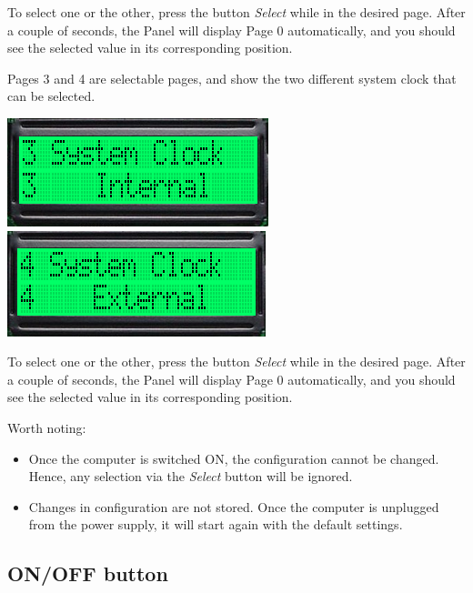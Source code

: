         To select one or the other, press the button \textit{Select} while in
        the desired page. After a couple of seconds, the Panel will display Page
        0 automatically, and you should see the selected value in its
        corresponding position.

        Pages 3 and 4 are selectable pages, and show the two different system
        clock that can be selected.

        \begin{center}
            \includegraphics[scale=0.7]{images/dastaZ80_ControlPanel_Page3.png}
            \includegraphics[scale=0.7]{images/dastaZ80_ControlPanel_Page4.png}
        \end{center}
                
        To select one or the other, press the button \textit{Select} while in
        the desired page. After a couple of seconds, the Panel will display Page
        0 automatically, and you should see the selected value in its
        corresponding position.

        Worth noting:

        \begin{itemize}
            \item Once the computer is switched ON, the configuration cannot be
                changed. Hence, any selection via the \textit{Select} button
                will be ignored.
            \item Changes in configuration are not stored. Once the computer is
                unplugged from the power supply, it will start again with the
                default settings.
        \end{itemize}

    \subsection{ON/OFF button}
    \label{subsec:onoffbutt}

